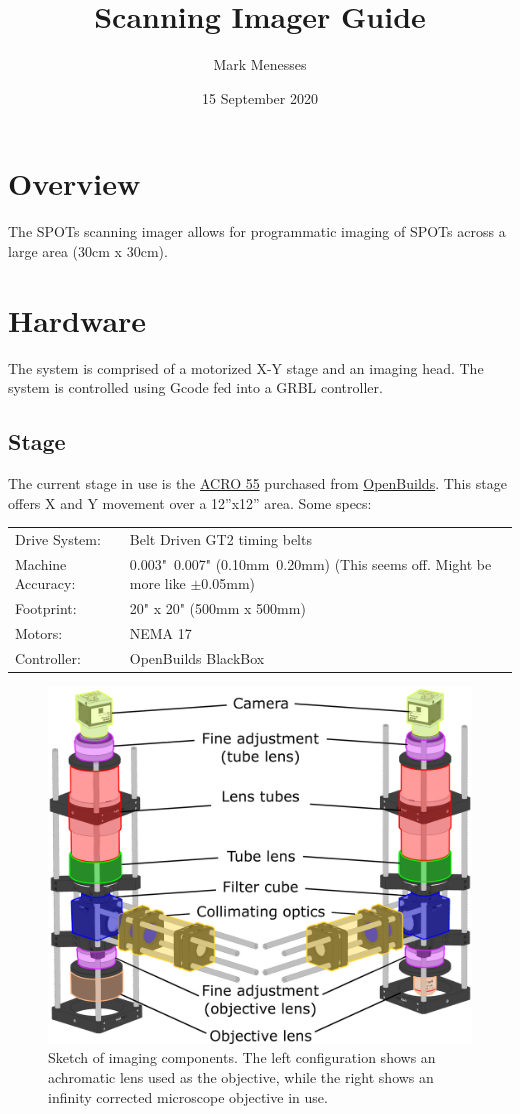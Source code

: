 \documentclass{article}
\title{Scanning Imager Guide}
\author{Mark Menesses}
\date{15 September 2020}
\begin{document}
\maketitle

\tableofcontents
\newpage

\section{Overview}
The SPOTs scanning imager allows for programmatic imaging of SPOTs across a large area (30cm x 30cm).
\section{Hardware}
The system is comprised of a motorized X-Y stage and an imaging head.
The system is controlled using Gcode fed into a GRBL controller.
\subsection{Stage}
The current stage in use is the \href{https://openbuilds.com/builds/openbuilds-acro-system.5416/}{ACRO 55} purchased from \href{https://openbuilds.com/}{OpenBuilds}.
This stage offers X and Y movement over a 12''x12'' area.
Some specs:

\begin{tabular}{l l}
     Drive System: & Belt Driven GT2 timing belts \\
     Machine Accuracy: & 0.003"~0.007" (0.10mm~0.20mm) (This seems off. Might be more like $\pm$0.05mm) \\
     Footprint: & 20" x 20" (500mm x 500mm) \\
     Motors: & NEMA 17 \\
     Controller: & OpenBuilds BlackBox \\
\end{tabular}


\begin{figure}[!h]
    \centering
    \includegraphics[width=0.75\columnwidth]{imager_sketch.eps}
    \caption{Sketch of imaging components. The left configuration shows an achromatic lens used as the objective, while the right shows an infinity corrected microscope objective in use.}
    \label{fig:sketch}
\end{figure}
\end{document}
